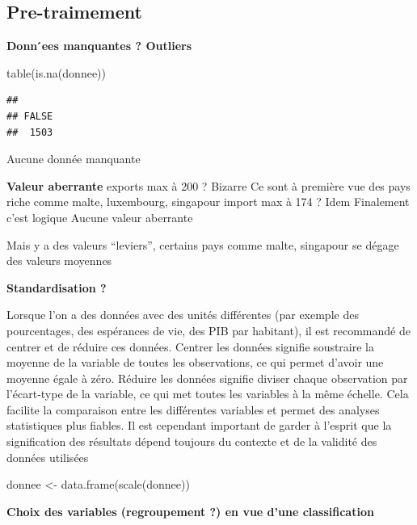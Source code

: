 \documentclass[
]{article}
\newenvironment{Shaded}{}{}
\newcommand{\FunctionTok}[1]{#1}
\newcommand{\NormalTok}[1]{#1}
\newcommand{\OtherTok}[1]{\textcolor[rgb]{1.00,0.25,0.00}{#1}}
\begin{document}
\hypertarget{pre-traimement}{%
\subsection{Pre-traimement}\label{pre-traimement}}

\textbf{Donn ́ees manquantes ? Outliers }

\begin{Shaded}
\begin{Highlighting}[]
\FunctionTok{table}\NormalTok{(}\FunctionTok{is.na}\NormalTok{(donnee))}
\end{Highlighting}
\end{Shaded}

\begin{verbatim}
## 
## FALSE 
##  1503
\end{verbatim}

Aucune donnée manquante

\textbf{Valeur aberrante} exports max à 200 ? Bizarre Ce sont à première
vue des pays riche comme malte, luxembourg, singapour import max à 174 ?
Idem Finalement c'est logique Aucune valeur aberrante

Mais y a des valeurs ``leviers'', certains pays comme malte, singapour
se dégage des valeurs moyennes

\textbf{Standardisation ?}

Lorsque l'on a des données avec des unités différentes (par exemple des
pourcentages, des espérances de vie, des PIB par habitant), il est
recommandé de centrer et de réduire ces données. Centrer les données
signifie soustraire la moyenne de la variable de toutes les
observations, ce qui permet d'avoir une moyenne égale à zéro. Réduire
les données signifie diviser chaque observation par l'écart-type de la
variable, ce qui met toutes les variables à la même échelle. Cela
facilite la comparaison entre les différentes variables et permet des
analyses statistiques plus fiables. Il est cependant important de garder
à l'esprit que la signification des résultats dépend toujours du
contexte et de la validité des données utilisées

\begin{Shaded}
\begin{Highlighting}[]
\NormalTok{donnee }\OtherTok{\textless{}{-}} \FunctionTok{data.frame}\NormalTok{(}\FunctionTok{scale}\NormalTok{(donnee))}
\end{Highlighting}
\end{Shaded}

\textbf{Choix des variables (regroupement ?) en vue d'une
classification}
\end{document}
